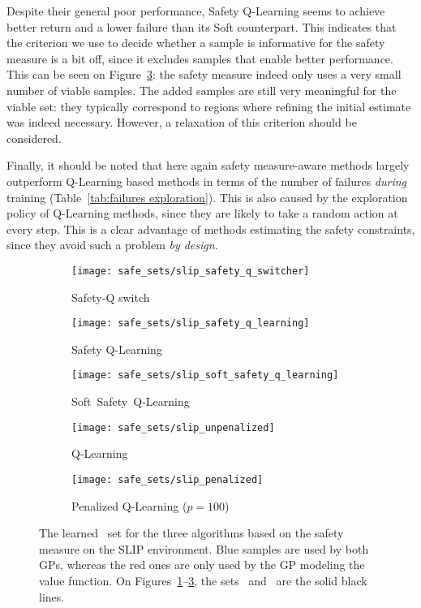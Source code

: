 Despite their general poor performance, Safety Q-Learning seems to achieve better return and a lower failure than its Soft counterpart. This indicates that the criterion we use to decide whether a sample is informative for the safety measure is a bit off, since it excludes samples that enable better performance. This can be seen on Figure~\ref{fig:learned sets:slip:soft safety q learning}: the safety measure indeed only uses a very small number of viable samples. The added samples are still very meaningful for the viable set: they typically correspond to regions where refining the initial estimate was indeed necessary. However, a relaxation of this criterion should be considered.\par
Finally, it should be noted that here again safety measure-aware methods largely outperform Q-Learning based methods in terms of the number of failures\emph{ during} training (Table~\ref{tab:failures exploration}). This is also caused by the exploration policy of Q-Learning methods, since they are likely to take a random action at every step. This is a clear advantage of methods estimating the safety constraints, since they avoid such a problem\emph{ by design}.

\begin{figure}[t]
	\centering
	\captionsetup[subfigure]{width=1.1\textwidth}
	\begin{subfigure}{0.31\textwidth}
		\centering
		\texttt{[image: safe\_sets/slip\_safety\_q\_switcher]}
		\caption{Safety-Q switch}
		\label{fig:learned sets:slip:switch}
	\end{subfigure}	
	\begin{subfigure}{0.31\textwidth}
		\centering
		\texttt{[image: safe\_sets/slip\_safety\_q\_learning]}
		\caption{Safety Q-Learning}
		\label{fig:learned sets:slip:safety q learning}
	\end{subfigure}	
	\begin{subfigure}{0.31\textwidth}
		\centering
		\texttt{[image: safe\_sets/slip\_soft\_safety\_q\_learning]}
		\caption{\mbox{Soft Safety Q-Learning}}
		\label{fig:learned sets:slip:soft safety q learning}
	\end{subfigure}	\newline
	\begin{subfigure}{0.39\textwidth}
		\texttt{[image: safe\_sets/slip\_unpenalized]}
		\caption{Q-Learning}
		\label{fig:learned sets:slip:q learning}
	\end{subfigure}
	\begin{subfigure}{0.39\textwidth}
		\texttt{[image: safe\_sets/slip\_penalized]}
		\caption{Penalized Q-Learning ($p=100$)}
		\label{fig:learned sets:slip:penalized}
	\end{subfigure}
	\caption{The learned \Qcaut~set for the three algorithms based on the safety measure on the SLIP environment. Blue samples are used by both GPs, whereas the red ones are only used by the GP modeling the value function. On Figures~\ref{fig:learned sets:slip:switch}--\ref{fig:learned sets:slip:soft safety q learning}, the sets \QV~and \Qcaut~are the solid black lines.}
	\label{fig:learned sets:slip}
\end{figure}
